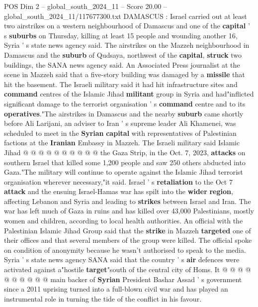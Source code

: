 \begin{textsample}{POS Dim 2 – global\_south\_2024\_11 – Score 20.00 – global\_south\_2024\_11/117677300.txt}  \label{ex:f2_pos_175}
DAMASCUS : Israel carried out at least two airstrikes on a western neighbourhood of Damascus and one of the \textbf{capital} ' s \textbf{suburbs} on Thursday, killing at least 15 people and wounding another 16, Syria ' s state news agency said.
The airstrikes on the Mazzeh neighbourhood in Damascus and the \textbf{suburb} of Qudsaya, northwest of the \textbf{capital}, \textbf{struck} two buildings, the SANA news agency said.
An Associated Press journalist at the scene in Mazzeh said that a five-story building was damaged by a \textbf{missile} that hit the basement.
The Israeli military said it had hit infrastructure sites and \textbf{command} centres of the Islamic Jihad \textbf{militant} group in Syria and had"inflicted significant damage to the terrorist organisation ' s \textbf{command} centre and to its \textbf{operatives}."The airstrikes in Damascus and the nearby \textbf{suburb} came shortly before Ali Larijani, an adviser to Iran ' s supreme leader Ali Khamenei, was scheduled to meet in the \textbf{Syrian} \textbf{capital} with representatives of Palestinian factions at the \textbf{Iranian} Embassy in Mazzeh.
The Israeli military said Islamic Jihad @ @ @ @ @ @ @ @ @ @ the Gaza Strip, in the Oct. 7, 2023, \textbf{attacks} on southern Israel that killed some 1,200 people and saw 250 others abducted into Gaza."The military will continue to operate against the Islamic Jihad terrorist organisation wherever necessary,"it said.
Israel ' s \textbf{retaliation} to the Oct 7 \textbf{attack} and the ensuing Israel-Hamas war has spilt into the \textbf{wider} \textbf{region}, affecting Lebanon and Syria and leading to \textbf{strikes} between Israel and Iran.
The war has left much of Gaza in ruins and has killed over 43,000 Palestinians, mostly women and children, according to local health authorities.
An official with the Palestinian Islamic Jihad Group said that the \textbf{strike} in Mazzeh \textbf{targeted} one of their offices and that several members of the group were killed.
The official spoke on condition of anonymity because he wasn't authorised to speak to the media.
Syria ' s state news agency SANA said that the country ' s \textbf{air} defences were activated against a"hostile \textbf{target}"south of the central city of Homs.
It @ @ @ @ @ @ @ @ @ @ main backer of \textbf{Syrian} President Bashar Assad ' s government since a 2011 uprising turned into a full-blown civil war and has played an instrumental role in turning the tide of the conflict in his favour.

\end{textsample}
